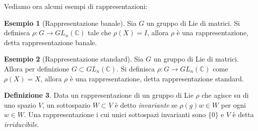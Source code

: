 \documentclass[12pt,a4paper]{report}
\theoremstyle{definition}
\newtheorem{Def}{Definizione}[chapter]
\theoremstyle{Theorem}
\theoremstyle{definition}
\newtheorem{Ex}[Def]{Esempio}
\theoremstyle{definition}
\theoremstyle{definition}
\begin{document}
Vediamo ora alcuni esempi di rappresentazioni:
\begin{Ex}[Rappresentazione banale]
	Sia $G$ un gruppo di Lie di matrici. Si definisca $\rho: G\rightarrow GL_n(\mathbb{C})$ tale che $\rho(X)=I$, allora $\rho$ è una rappresentazione, detta rappresentazione banale. 
\end{Ex}
\begin{Ex}[Rappresentazione standard]
	Sia $G$ un gruppo di Lie di matrici. Allora per definizione $G\subset GL_n(\mathbb{C})$. Si definisca $\rho: G\rightarrow GL_n(\mathbb{C})$ come $\rho(X)=X$, allora $\rho$ è una rappresentazione, detta rappresentazione standard. 
\end{Ex}
\begin{Def}
	Data un rappresentazione di un gruppo di Lie $\rho$ che agisce su di uno spazio $V$, un sottospazio $W\subset V$ è detto \textit{invariante} se $\rho(g)w\in W$ per ogni $w\in W$.
	Una rappresentazione i cui unici sottospazi invarianti sono $\{0\}$ e $V$ è detta \textit{irriducibile}.
\end{Def}
\end{document}
